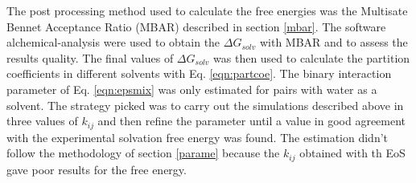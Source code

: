 The post processing method used to calculate the free energies was the Multisate Bennet Acceptance Ratio (MBAR) described in section \ref{mbar}. The software alchemical-analysis \cite{klimovich} were used to obtain the $\Delta G_{solv}$ with MBAR and to assess the results quality. The final values of $\Delta G_{solv}$ was then used to calculate the partition coefficients in different solvents with Eq. \eqref{eqn:partcoe}. The binary interaction  parameter of Eq. \eqref{eqn:epsmix} was only estimated for pairs with water as a solvent. The strategy picked was to carry out the simulations described above in three values of $k_{ij}$ and then refine the parameter until a value in good agreement with the experimental solvation free energy was found. The estimation didn't follow the methodology of section \ref{parame} because the $k_{ij}$ obtained with th EoS gave poor results for the free energy.



